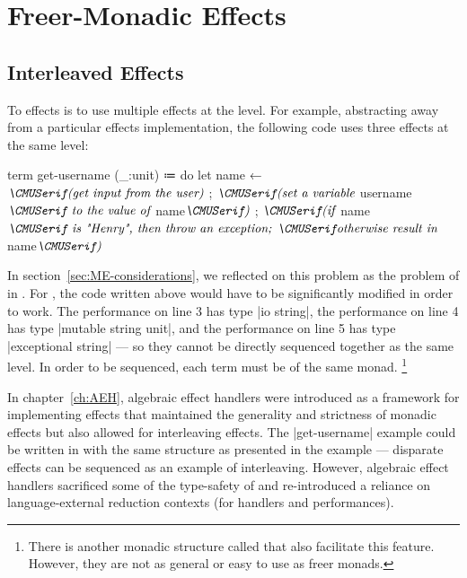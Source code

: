 \chapter{Freer-Monadic Effects}
\label{ch:FME}


\section{Interleaved Effects}

To  effects is to use multiple effects at the level.
For example, abstracting away from a particular effects implementation, the following code uses three effects at the same level:
%
\begin{snippet}[numbers=left]
term get-username (_:unit)
  ≔ do
      { let name ← $\normtextit{(get input from the user)}$
      ; $\normtextit{(set a variable }$username$\normtextit{ to the value of }$name$\normtextit{)}$
      ; $\normtextit{(if }$name$\normtextit{ is "Henry", then throw an exception;}$
        $\normtextit{otherwise result in }$name$\normtextit{)}$ }
\end{snippet}
%
In section~\ref{sec:ME-considerations}, we reflected on this problem as the problem of  in \LangC.
For \LangC, the code written above would have to be significantly modified in order to work.
The performance on line 3 has type \code|io string|,
the performance on line 4 has type \code|mutable string unit|, and
the performance on line 5 has type \code|exceptional string| ---
so they cannot be directly sequenced together as the same level.
In order to be sequenced, each term must be of the same monad.%
\footnote{
  There is another monadic structure called  that also facilitate this feature.
  However, they are not as general or easy to use as freer monads.
}

In chapter~\ref{ch:AEH}, algebraic effect handlers were introduced as a framework for implementing effects that maintained the generality and strictness of monadic effects but also allowed for interleaving effects.
The \code|get-username| example could be written in \LangD with the same structure as presented in the example --- disparate effects can be sequenced as an example of interleaving.
However, algebraic effect handlers sacrificed some of the type-safety of \LangC and re-introduced a reliance on language-external reduction contexts (for handlers and performances).

